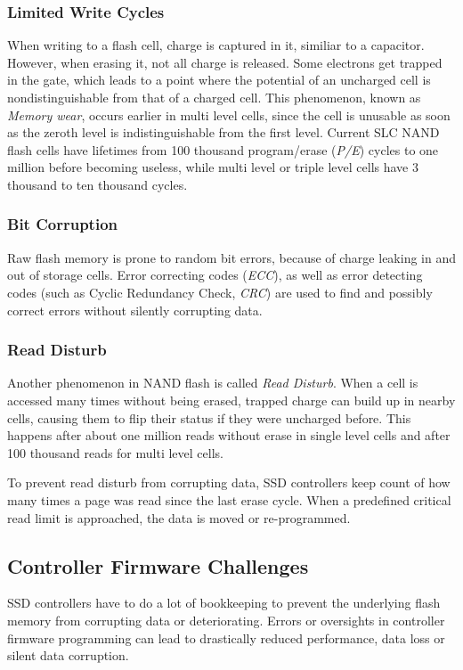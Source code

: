 \documentclass{acm_proc_article-sp}
\begin{document}
\subsubsection*{Limited Write Cycles}
When writing to a flash cell, charge is captured in it, similiar to a capacitor. %
However, when erasing it, not all charge is released. Some electrons get trapped in the gate, which leads to a point where the potential of an uncharged cell is nondistinguishable from that of a charged cell. This phenomenon, known as \emph{Memory wear}, occurs earlier in multi level cells, since the cell is unusable as soon as the zeroth level is indistinguishable from the first level.
Current SLC NAND flash cells have lifetimes from 100 thousand program/erase (\emph{P/E}) cycles to one million before becoming useless, while multi level or triple level cells have 3 thousand to ten thousand cycles.

\subsubsection*{Bit Corruption}
Raw flash memory is prone to random bit errors, because of charge leaking in and out of storage cells. Error correcting codes (\emph{ECC}), as well as error detecting codes (such as Cyclic Redundancy Check, \emph{CRC}) are used to find and possibly correct errors without silently corrupting data.

\subsubsection*{Read Disturb}
Another phenomenon in NAND flash is called \emph{Read Disturb}. When a cell is accessed many times without being erased, trapped charge can build up in nearby cells, causing them to flip their status if they were uncharged before. %
This happens after about one million reads without erase in single level cells and after 100 thousand reads for multi level cells.

To prevent read disturb from corrupting data, SSD controllers keep count of how many times a page was read since the last erase cycle. When a predefined critical read limit is approached, the data is moved or re-programmed.

\subsection{Controller Firmware Challenges}
SSD controllers have to do a lot of bookkeeping to prevent the underlying flash memory from corrupting data or deteriorating. Errors or oversights in controller firmware programming can lead to drastically reduced performance, data loss or silent data corruption.
\end{document}
